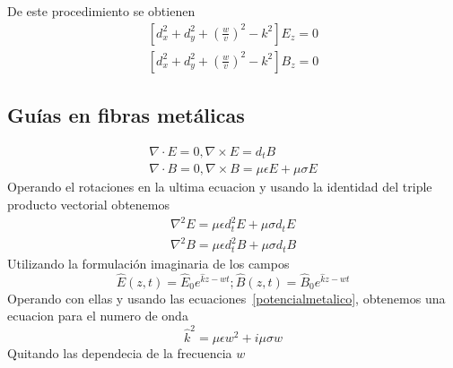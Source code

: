 De este procedimiento se obtienen  
\begin{subequations}\label{Helmholtz}
	\begin{align}
[d_{x}^2+d_{y}^2+(\frac{w}{v})^2-k^2] E_{z}=0\\
[d_{x}^2+d_{y}^2+(\frac{w}{v})^2-k^2] B_{z}=0
	\end{align}
\end{subequations}
\subsection{Guías en fibras metálicas}
\begin{subequations}
	\begin{align} \label{mawxellmetalicas}
	\nabla \cdot E= 0 , \nabla \times E = d_{t}B\\
	\nabla \cdot B=0, \nabla \times B = \mu \epsilon E + \mu \sigma E  
	\end{align}
	\end{subequations}
Operando el rotaciones en la ultima ecuacion y usando la identidad del triple producto vectorial obtenemos
\begin{subequations}\label{potencialmetalico}
\begin{align}
	\nabla^2 E=\mu \epsilon d_{t}^2E+\mu\sigma d_{t} E \\
	\nabla^2 B=\mu \epsilon d_{t}^2B+\mu\sigma d_{t} B 
\end{align}
\end{subequations}
Utilizando la formulación imaginaria de los campos
\begin{equation}
	\widehat{E}(z,t)=\widehat{E}_{0} e^{\hat{k}z-wt} ; \widehat{B}(z,t)=\widehat{B}_{0} e^{\hat{k}z-wt} 
\end{equation}
Operando con ellas y usando las ecuaciones~\ref{potencialmetalico}, obtenemos una ecuacion para
el numero de onda
\begin{equation}
\widehat{k}^2=\mu \epsilon w^2 + i \mu \sigma w
\end{equation}
Quitando las dependecia de la frecuencia $w$ 
